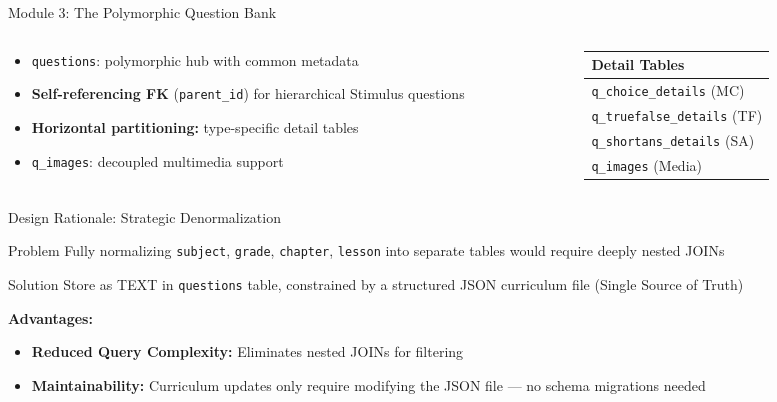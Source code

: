 \documentclass[aspectratio=169, 10pt]{beamer}
\begin{document}
\begin{frame}{Module 3: The Polymorphic Question Bank}
    \begin{columns}[T]
        \begin{column}{0.55\textwidth}
            \begin{itemize}
                \item \texttt{questions}: polymorphic hub with common metadata
                \item \textbf{Self-referencing FK} (\texttt{parent\_id}) for hierarchical Stimulus questions
                \item \textbf{Horizontal partitioning:} type-specific detail tables
                \item \texttt{q\_images}: decoupled multimedia support
            \end{itemize}
        \end{column}
        \begin{column}{0.42\textwidth}
            \centering
            \small
            \begin{tabular}{|l|}
                \hline
                \textbf{Detail Tables} \\ \hline
                \texttt{q\_choice\_details} (MC) \\ \hline
                \texttt{q\_truefalse\_details} (TF) \\ \hline
                \texttt{q\_shortans\_details} (SA) \\ \hline
                \texttt{q\_images} (Media) \\ \hline
            \end{tabular}
        \end{column}
    \end{columns}
\end{frame}


\begin{frame}{Design Rationale: Strategic Denormalization}
    \begin{block}{Problem}
        Fully normalizing \texttt{subject}, \texttt{grade}, \texttt{chapter}, \texttt{lesson} into separate tables would require deeply nested JOINs
    \end{block}
    \vspace{0.2cm}
    \begin{block}{Solution}
        Store as TEXT in \texttt{questions} table, constrained by a structured JSON curriculum file (Single Source of Truth)
    \end{block}
    \vspace{0.2cm}
    \textbf{Advantages:}
    \begin{itemize}
        \item \textbf{Reduced Query Complexity:} Eliminates nested JOINs for filtering
        \item \textbf{Maintainability:} Curriculum updates only require modifying the JSON file — no schema migrations needed
    \end{itemize}
\end{frame}
\end{document}
